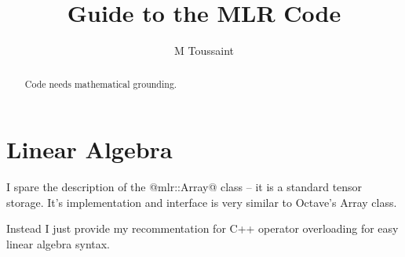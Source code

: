 \documentclass[10pt,fleqn,twoside]{article}
\title{Guide to the MLR Code}
\author{M Toussaint}
\begin{document}
\maketitle

\begin{abstract}
Code needs mathematical grounding.
\end{abstract}

{\footnotesize\tableofcontents

}


\section{Linear Algebra}

I spare the description of the @mlr::Array@ class -- it is a standard
tensor storage. It's implementation and interface is very similar to
Octave's Array class.

Instead I just provide my recommentation for C++ operator overloading
for easy linear algebra syntax.
\end{document}
